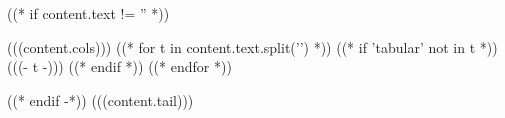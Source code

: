 \newlength{\originallinewidth}
\setlength{\originallinewidth}{1.0\linewidth}
\setlength{\linewidth}{\minof{12.5cm}{\linewidth}}

((* if content.text != '' *))
{\setlength\topsep{0pt}\setlength\parskip{0pt}\begin{center}
\begin{tabular}{(((content.cols)))} \hline
((* for t in content.text.split('\n') *))
((* if 'tabular' not in t *))
(((- t -)))
((* endif *))
((* endfor *))
\end{tabular}
\end{center}}
((* endif -*)) (((content.tail)))
\vspace{10pt}

\setlength{\linewidth}{\originallinewidth}
